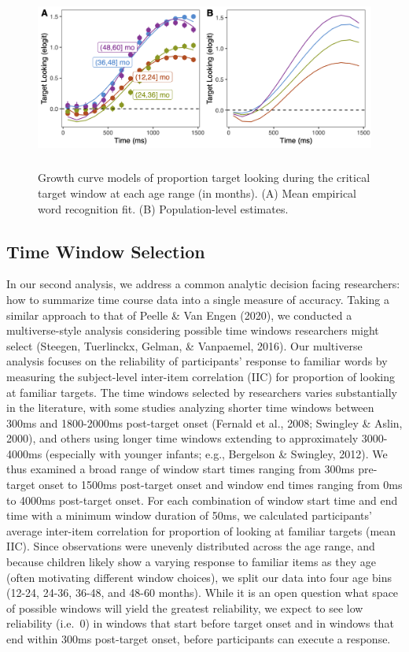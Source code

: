 \documentclass[10pt, letterpaper]{article}
\begin{document}
\begin{figure} 
\includegraphics[width=14cm,height=6cm]{../figures/age_gca.png}
\caption{Growth curve models of proportion target looking during the critical target window at each age range (in months). (A) Mean empirical word recognition fit. (B) Population-level estimates.}
\label{fig:age_gca}
\end{figure}

\hypertarget{time-window-selection}{%
\subsection{Time Window Selection}\label{time-window-selection}}

In our second analysis, we address a common analytic decision facing
researchers: how to summarize time course data into a single measure of
accuracy. Taking a similar approach to that of Peelle \& Van Engen
(2020), we conducted a multiverse-style analysis considering possible
time windows researchers might select (Steegen, Tuerlinckx, Gelman, \&
Vanpaemel, 2016). Our multiverse analysis focuses on the reliability of
participants' response to familiar words by measuring the subject-level
inter-item correlation (IIC) for proportion of looking at familiar
targets. The time windows selected by researchers varies substantially
in the literature, with some studies analyzing shorter time windows
between 300ms and 1800-2000ms post-target onset (Fernald et al., 2008;
Swingley \& Aslin, 2000), and others using longer time windows extending
to approximately 3000-4000ms (especially with younger infants; e.g.,
Bergelson \& Swingley, 2012). We thus examined a broad range of window
start times ranging from 300ms pre-target onset to 1500ms post-target
onset and window end times ranging from 0ms to 4000ms post-target onset.
For each combination of window start time and end time with a minimum
window duration of 50ms, we calculated participants' average inter-item
correlation for proportion of looking at familiar targets (mean IIC).
Since observations were unevenly distributed across the age range, and
because children likely show a varying response to familiar items as
they age (often motivating different window choices), we split our data
into four age bins (12-24, 24-36, 36-48, and 48-60 months). While it is
an open question what space of possible windows will yield the greatest
reliability, we expect to see low reliability (i.e.~0) in windows that
start before target onset and in windows that end within 300ms
post-target onset, before participants can execute a response.
\end{document}
